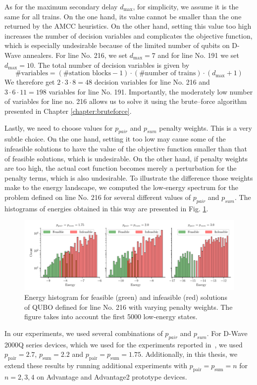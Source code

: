 As for the maximum secondary delay $d_{\max}$, for simplicity, we assume it is
    the same for all trains. On the one hand, its value cannot be smaller than the
    one returned by the AMCC heuristics. On the other hand, setting this value too
    high increases the number of decision variables and complicates the objective
    function, which is especially undesirable because of the limited number of
    qubits on D-Wave annealers. For line No. 216, we set $d_{\max}=7$ and for line
    No. 191 we set $d_{\max}=10$. The total number of decision variables is given
    by
    \begin{equation}
      \mbox{\#variables} = (\mbox{\#station blocks}-1) \cdot (\mbox{\#number of trains}) \cdot (d_{\max}+1)
    \end{equation}
    We therefore get $2\cdot 3 \cdot 8 = 48$ decision variables for line No. 216
    and $3 \cdot 6 \cdot 11 = 198$ variables for line No. 191. Importantly, the
moderately low number of variables for line no. 216 allows us to solve it using
the brute--force algorithm presented in Chapter \ref{chapter:bruteforce}.

Lastly, we need to choose values for $p_{pair}$ and $p_{sum}$ penalty weights.
    This is a very subtle choice. On the one hand, setting it too low may cause
    some of the infeasible solutions to have the value of the objective function
    smaller than that of feasible solutions, which is undesirable. On the other
    hand, if penalty weights are too high, the actual cost function becomes merely
    a perturbation for the penalty terms, which is also undesirable. To illustrate
    the difference those weights make to the energy landscape, we computed the
    low-energy spectrum for the problem defined on line No. 216 for several
    different values of $p_{pair}$ and $p_{sum}$. The histograms of energies
obtained in this way are presented in Fig. \ref{fig:penaltyhistogram}.

\begin{figure}
  \includegraphics[width=\textwidth]{figures/railway_histograms_bf}
  \caption{Energy histogram for feasible (green) and infeasible (red) solutions of QUBO
    defined for line No. 216 with varying penalty weights. The figure takes into
    account the first 5000 low-energy states.} \label{fig:penaltyhistogram}
\end{figure}
In our experiments, we used several combinations of $p_{pair}$ and $p_{sum}$.
For D-Wave 2000Q series devices, which we used for the experiments reported
in~\cite{railwaydispatching}, we used $p_{\text{pair}}=2.7$,
  $p_{\text{sum}}=2.2$ and $p_{\text{pair}} = p_{\text{sum}} = 1.75$.
    Additionally, in this thesis, we extend these results by running additional
    experiments with $p_{\text{pair}}=p_{\text{sum}}=n$ for $n=2, 3, 4$ on
Advantage and Advantage2 prototype devices.

